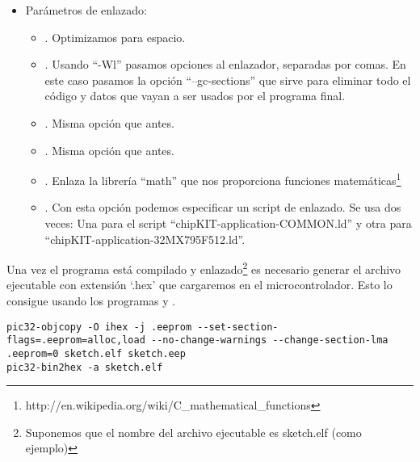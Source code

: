 \begin{itemize}
\begin{itemize}
        \item {}.Definimos el macro ``\_BOARD\_MEGA\_'' con valor 1. Indica que estamos usando una placa con el formato de un Arduino Mega.
        \item {}. Definimos el valor de ``MPIDEVER'', que es ``0x01000305''.
        \item {}. Definimos la versión de  que hemos usado. En nuestro caso es la versión 23.
    \end{itemize}
    \item Parámetros de enlazado:
        \begin{itemize}
            \item {}. Optimizamos para espacio.
            \item {}. Usando ``-Wl'' pasamos opciones al enlazador, separadas por comas. En este caso pasamos la opción ``--gc-sections'' que sirve para eliminar todo el código y datos que vayan a ser usados por el programa final.
            \item {}. Misma opción que antes.
            \item {}. Misma opción que antes.
            \item {}. Enlaza la librería ``math'' que nos proporciona funciones matemáticas\protect\footnote{http://en.wikipedia.org/wiki/C\_mathematical\_functions}
            \item {}. Con esta opción podemos especificar un script de enlazado. Se usa dos veces: Una para el script ``chipKIT-application-COMMON.ld'' y otra para ``chipKIT-application-32MX795F512.ld''.
        \end{itemize}
\end{itemize}

Una vez el programa está compilado y enlazado\protect\footnote{Suponemos que el nombre del archivo ejecutable es sketch.elf (como ejemplo)} es necesario generar el archivo ejecutable con extensión `.hex' que cargaremos en el microcontrolador. Esto lo consigue  usando los programas  y .
\begin{lstlisting}[breaklines=true]
pic32-objcopy -O ihex -j .eeprom --set-section-flags=.eeprom=alloc,load --no-change-warnings --change-section-lma .eeprom=0 sketch.elf sketch.eep
pic32-bin2hex -a sketch.elf
\end{lstlisting}


